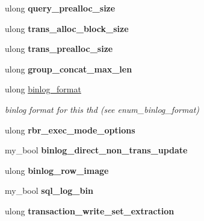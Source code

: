 \begin{DoxyCompactItemize}
ulong {\bfseries query\+\_\+prealloc\+\_\+size}
\item 
\mbox{\label{structsystem__variables_aa6d63f8b6be32a308261a244a42aaa40}} 
ulong {\bfseries trans\+\_\+alloc\+\_\+block\+\_\+size}
\item 
\mbox{\label{structsystem__variables_a83f08f7906e76acb0233262d061d0a6d}} 
ulong {\bfseries trans\+\_\+prealloc\+\_\+size}
\item 
\mbox{\label{structsystem__variables_a09bcc806eeae7ab8a8440d374365e9b0}} 
ulong {\bfseries group\+\_\+concat\+\_\+max\+\_\+len}
\item 
\mbox{\label{structsystem__variables_a76e0cfd8d6117b905cb117190b427391}} 
ulong \mbox{\hyperlink{structsystem__variables_a76e0cfd8d6117b905cb117190b427391}{binlog\+\_\+format}}
\begin{DoxyCompactList}\small\item\em binlog format for this thd (see enum\+\_\+binlog\+\_\+format) \end{DoxyCompactList}\item 
\mbox{\label{structsystem__variables_a5a6b135fe85713f5428d002d04ea5d6f}} 
ulong {\bfseries rbr\+\_\+exec\+\_\+mode\+\_\+options}
\item 
\mbox{\label{structsystem__variables_afd416661c881f1a5b8d8a7e2bad462b4}} 
my\+\_\+bool {\bfseries binlog\+\_\+direct\+\_\+non\+\_\+trans\+\_\+update}
\item 
\mbox{\label{structsystem__variables_a4303a067c36cef51d0d6e5d838f127f2}} 
ulong {\bfseries binlog\+\_\+row\+\_\+image}
\item 
\mbox{\label{structsystem__variables_a059d7f6a70d7f9724c8023832dd9a85b}} 
my\+\_\+bool {\bfseries sql\+\_\+log\+\_\+bin}
\item 
\mbox{\label{structsystem__variables_a884e87800003b1ab9df00d81fd2e8990}} 
ulong {\bfseries transaction\+\_\+write\+\_\+set\+\_\+extraction}
\item 

\end{DoxyCompactItemize}

